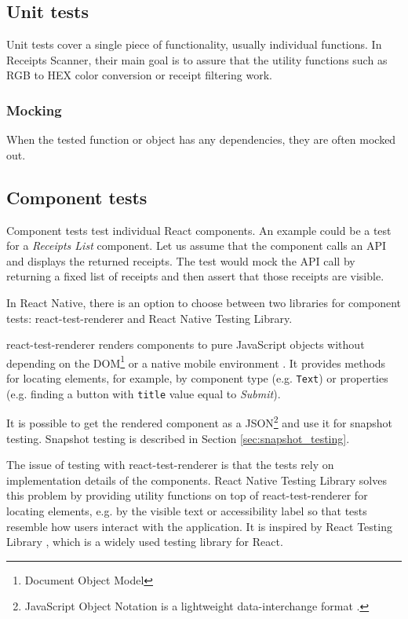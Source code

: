 \documentclass[
  digital, %
  table,   %
  oneside, %
  lof,     %
  lot,     %
]{fithesis3}
\begin{document}
\subsection{Unit tests}
Unit tests cover a single piece of functionality, usually individual functions. In Receipts Scanner, their main goal is to assure that the utility functions such as RGB to HEX color conversion or receipt filtering work.

\subsubsection{Mocking}
When the tested function or object has any dependencies, they are often mocked out.

\subsection{Component tests}
Component tests test individual React components. An example could be a test for a \textit{Receipts List} component. Let us assume that the component calls an API and displays the returned receipts. The test would mock the API call by returning a fixed list of receipts and then assert that those receipts are visible. 

In React Native, there is an option to choose between two libraries for component tests: react-test-renderer and React Native Testing Library. 

react-test-renderer renders components to pure JavaScript objects without depending on the DOM\footnote{Document Object Model} or a native mobile environment \cite{ReactTestRenderer}. It provides methods for locating elements, for example, by component type (e.g. \texttt{Text}) or properties (e.g. finding a button with \texttt{title} value equal to \textit{Submit}).

It is possible to get the rendered component as a JSON\footnote{JavaScript Object Notation is a lightweight data-interchange format \cite{Ecma2017JSON}.} and use it for snapshot testing. Snapshot testing is described in Section \ref{sec:snapshot_testing}.

The issue of testing with react-test-renderer is that the tests rely on implementation details of the components. React Native Testing Library solves this problem by providing utility functions on top of react-test-renderer \cite{ReactNativeTestingLibrary} for locating elements, e.g. by the visible text or accessibility label so that tests resemble how users interact with the application. It is inspired by React Testing Library \cite{ReactNativeTestingLibrary}, which is a widely used testing library for React.
\end{document}
